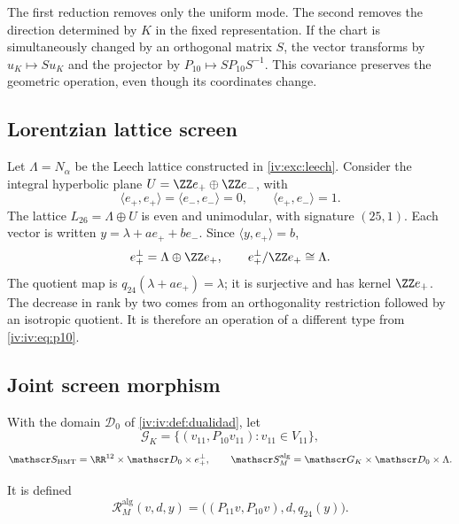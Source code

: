 The first reduction removes only the uniform mode.
The second removes the direction determined by \(K\) in
the fixed representation. If the chart is simultaneously changed
by an orthogonal matrix \(S\), the vector transforms by
\(u_K\mapsto Su_K\) and the projector by
\(P_{10}\mapsto SP_{10}S^{-1}\). This covariance preserves
the geometric operation, even though its coordinates change.

\subsection{Lorentzian lattice screen}

Let \(\Lambda=N_\alpha\) be the Leech lattice constructed
in \ref{iv:exc:leech}. Consider the integral hyperbolic plane
\(U=\ZZ e_+\oplus\ZZ e_-\), with
\[
 \langle e_+,e_+\rangle=\langle e_-,e_-\rangle=0,
 \qquad\langle e_+,e_-\rangle=1.
\]
The lattice \(L_{26}=\Lambda\oplus U\) is even and
unimodular, with signature \((25,1)\). Each vector is written
\(y=\lambda+ae_++be_-\). Since
\(\langle y,e_+\rangle=b\),
\begin{equation}
 e_+^\perp=\Lambda\oplus\ZZ e_+,
 \qquad e_+^\perp/\ZZ e_+\cong\Lambda.
 \label{iv:iv:eq:26-24}
\end{equation}
The quotient map is
\(q_{24}(\lambda+ae_+)=\lambda\); it is surjective and has
kernel \(\ZZ e_+\). The decrease in rank by two comes
from an orthogonality restriction followed by an isotropic
quotient. It is therefore an operation of a different type from
\eqref{iv:iv:eq:p10}.

\subsection{Joint screen morphism}

With the domain \(\mathscr D_0\) of \ref{iv:iv:def:dualidad},
let
\[
 \mathscr G_K=\{(v_{11},P_{10}v_{11}):v_{11}\in V_{11}\},
\]
\[
 \mathscr S_{\mathrm{HMT}}=\RR^{12}\times\mathscr D_0\times e_+^\perp,
 \qquad
 \mathscr S_M^{\mathrm{alg}}=\mathscr G_K\times\mathscr D_0\times\Lambda.
\]
\begin{definition}
\label{iv:iv:def:rm-alg}
It is defined
\begin{equation}
 \mathcal R_M^{\mathrm{alg}}(v,d,y)
 =\bigl((P_{11}v,P_{10}v),d,q_{24}(y)\bigr).
 \label{iv:iv:eq:rm-alg}
\end{equation}
\end{definition}


